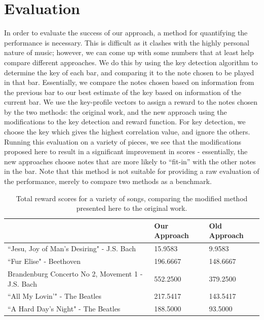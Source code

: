 \documentclass[11pt]{article} %
\begin{document}
\section{Evaluation}
In order to evaluate the success of our approach, a method for quantifying the performance is necessary. This is difficult as it clashes with the highly personal nature of music; however, we can come up with some numbers that at least help compare different approaches. We do this by using the key detection algorithm to determine the key of each bar, and comparing it to the note chosen to be played in that bar. Essentially, we compare the notes chosen based on information from the previous bar to our best estimate of the key based on information of the current bar. We use the key-profile vectors to assign a reward to the notes chosen by the two methods: the original work, and the new approach using the modifications to the key detection and reward function. For key detection, we choose the key which gives the highest correlation value, and ignore the others. Running this evaluation on a variety of pieces, we see that the modifications proposed here to result in a significant improvement in scores - essentially, the new approaches choose notes that are more likely to ``fit-in'' with the other notes in the bar. Note that this method is not suitable for providing a raw evaluation of the performance, merely to compare two methods as a benchmark.

\begin{table}[h]
\begin{tabular}{@{}lll@{}}
\toprule
                                      & Our Approach & Old Approach \\ \midrule
``Jesu, Joy of Man's Desiring" - J.S. Bach         & 15.9583      & 9.9583       \\
``Fur Elise" - Beethoven                          & 196.6667     & 148.6667     \\
Brandenburg Concerto No 2, Movement 1 - J.S. Bach & 552.2500     & 379.2500     \\
``All My Lovin'" - The Beatles         & 217.5417     & 143.5417     \\
``A Hard Day's Night" - The Beatles         & 188.5000     & 93.5000      \\ \bottomrule
\end{tabular}
\caption{Total reward scores for a variety of songs, comparing the modified method presented here to the original work.}
\label{table:scores}
\end{table}
\end{document}
